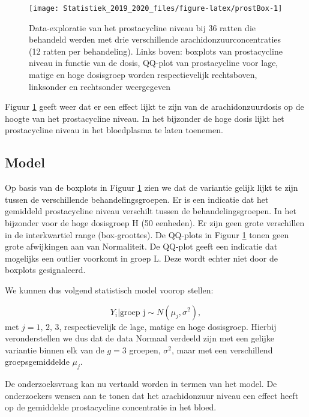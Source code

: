 \documentclass[12pt,dutch,coursenotes]{book}
\theoremstyle{definition}
\theoremstyle{definition}
\theoremstyle{definition}
\theoremstyle{remark}
\begin{document}
\begin{figure}

{\centering \texttt{[image: Statistiek\_2019\_2020\_files/figure-latex/prostBox-1]} 

}

\caption{Data-exploratie van het prostacycline niveau bij 36 ratten die behandeld werden met drie verschillende arachidonzuurconcentraties (12 ratten per behandeling). Links boven: boxplots van prostacycline niveau in functie van de dosis, QQ-plot van prostacycline voor lage, matige en hoge dosisgroep worden respectievelijk rechtsboven, linksonder en rechtsonder weergegeven}\label{fig:prostBox}
\end{figure}

Figuur \ref{fig:prostBox} geeft weer dat er een effect lijkt te zijn van
de arachidonzuurdosis op de hoogte van het prostacycline niveau. In het
bijzonder de hoge dosis lijkt het prostacycline niveau in het
bloedplasma te laten toenemen.

\subsection{Model}\label{model-1}

Op basis van de boxplots in Figuur \ref{fig:prostBox} zien we dat de
variantie gelijk lijkt te zijn tussen de verschillende
behandelingsgroepen. Er is een indicatie dat het gemiddeld prostacycline
niveau verschilt tussen de behandelingsgroepen. In het bijzonder voor de
hoge dosisgroep H (50 eenheden). Er zijn geen grote verschillen in de
interkwartiel range (box-groottes). De QQ-plots in Figuur
\ref{fig:prostBox} tonen geen grote afwijkingen aan van Normaliteit. De
QQ-plot geeft een indicatie dat mogelijks een outlier voorkomt in groep
L. Deze wordt echter niet door de boxplots gesignaleerd.

We kunnen dus volgend statistisch model voorop stellen:

\[Y_i \vert \text{groep j} \sim N(\mu_j,\sigma^2),\] met
\(j= \text{1, 2, 3}\), respectievelijk de lage, matige en hoge
dosisgroep. Hierbij veronderstellen we dus dat de data Normaal verdeeld
zijn met een gelijke variantie binnen elk van de \(g=3\) groepen,
\(\sigma^2\), maar met een verschillend groepsgemiddelde \(\mu_j\).

De onderzoeksvraag kan nu vertaald worden in termen van het model. De
onderzoekers wensen aan te tonen dat het arachidonzuur niveau een effect
heeft op de gemiddelde prostacycline concentratie in het bloed.
\end{document}
